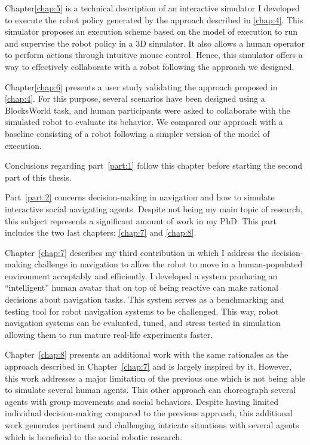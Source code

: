 Chapter\ref{chap:5} is a technical description of an interactive simulator I developed to execute the robot policy generated by the approach described in \ref{chap:4}. This simulator proposes an execution scheme based on the model of execution to run and supervise the robot policy in a 3D simulator. It also allows a human operator to perform actions through intuitive mouse control. Hence, this simulator offers a way to effectively collaborate with a robot following the approach we designed.    

Chapter\ref{chap:6} presents a user study validating the approach proposed in \ref{chap:4}. For this purpose, several scenarios have been designed using a BlocksWorld task, and human participants were asked to collaborate with the simulated robot to evaluate its behavior. We compared our approach with a baseline consisting of a robot following a simpler version of the model of execution. 

Conclusions regarding part~\ref{part:1} follow this chapter before starting the second part of this thesis. 

Part~\ref{part:2} concerns decision-making in navigation and how to simulate interactive social navigating agents. Despite not being my main topic of research, this subject represents a significant amount of work in my PhD. This part includes the two last chapters: \ref{chap:7} and \ref{chap:8}.

Chapter~\ref{chap:7} describes my third contribution in which I address the decision-making challenge in navigation to allow the robot to move in a human-populated environment acceptably and efficiently. I developed a system producing an ``intelligent'' human avatar that on top of being reactive can make rational decisions about navigation tasks. This system serves as a benchmarking and testing tool for robot navigation systems to be challenged. This way, robot navigation systems can be evaluated, tuned, and stress tested in simulation allowing them to run mature real-life experiments faster.  

Chapter~\ref{chap:8} presents an additional work with the same rationales as the approach described in Chapter~\ref{chap:7} and is largely inspired by it. However, this work addresses a major limitation of the previous one which is not being able to simulate several human agents. This other approach can choreograph several agents with group movements and social behaviors. Despite having limited individual decision-making compared to the previous approach, this additional work generates pertinent and challenging intricate situations with several agents which is beneficial to the social robotic research.

